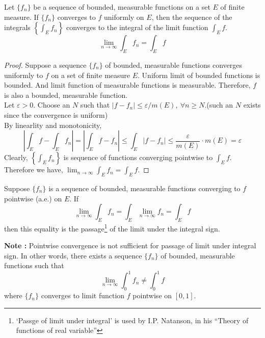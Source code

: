 \begin{theorem}
	Let $\{ f_n \}$ be a sequence of bounded, measurable functions on a set $E$ of finite measure.
	If $\{ f_n \}$ converges to $f$ uniformly on $E$, then the sequence of the integrals $\left\{ \int_E f_n \right\}$ converges to the integral of the limit function $\int_E f$.
	\begin{equation}
		\lim_{n \to \infty} \int_E f_n = \int_E f
	\end{equation}
\end{theorem}
\begin{proof}
	Suppose a sequence $\{ f_n \}$ of bounded, measurable functions converges uniformly to $f$ on a set of finite measure $E$.
	Uniform limit of bounded functions is bounded.
	And limit function of measurable functions is measurable.
	Therefore, $f$ is also a bounded, measurable function.\\

	Let $\varepsilon > 0$.
	Choose an $N$ such that $|f - f_n | \le \varepsilon/m(E),\ \forall n \ge N$.(such an $N$ exists since the convergence is uniform)\\
	By linearlity and monotonicity,
	\[ \left| \int_E f - \int_E f_n \right| = \left| \int_E f - f_n \right| \le \int_E |f-f_n| \le \frac{\varepsilon}{m(E)} \cdot m(E) = \varepsilon \]
	Clearly, $\displaystyle \left\{ \int_E f_n \right\}$ is sequence of functions converging pointwise to $\displaystyle \int_E f$.
	Therefore we have, $\displaystyle \lim_{n \to \infty} \int_E f_n = \int_E f$.
\end{proof}
\begin{definition}
	Suppose $\{ f_n \}$ is a sequence of bounded, measurable functions converging to $f$ pointwise (a.e.) on $E$.
	If 
	\begin{equation}
		\lim_{n \to \infty} \int_E f_n  = \int_E \lim_{n \to \infty} f_n = \int_E f 
	\end{equation}
	then this equality is the passage\dag\footnote{
		`Passge of limit under integral' is used by I.P. Natanson,
		in his ``Theory of functions of real variable''}
	of the limit under the integral sign.
\end{definition}

	\textbf{Note : } Pointwise convergence is not sufficient for passage of limit under integral sign.
	In other words, there exists a sequence $\{ f_n \}$ of bounded, measurable functions such that
	\[ \lim_{n \to \infty} \int_0^1 f_n \ne \int_0^1 f \]
	where $\{ f_n \}$ converges to limit function $f$ pointwise on $[0,1]$.

